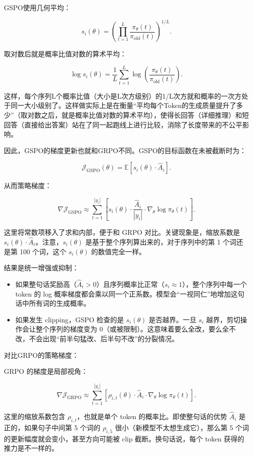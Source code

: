 GSPO使用几何平均：

\[
s_i(\theta)
=
\left(
\prod_{t=1}^{L}
\frac{\pi_\theta(t)}
{\pi_{\mathrm{old}}(t)}
\right)^{1/L}.
\]

取对数后就是概率比值对数的算术平均：

\[
\log s_i(\theta)
=
\frac{1}{L}
\sum_{t=1}^{L}
\log\left(
\frac{\pi_\theta(t)}
{\pi_{\mathrm{old}}(t)}
\right).
\]

这样，每个序列L个概率比值（大小是L次方级别）的1/L次方就和概率的一次方处于同一大小级别了。这样做实际上是在衡量``平均每个Token的生成质量提升了多少''（取对数之后，就是概率比值对数的算术平均），使得长回答（详细推理）和短回答（直接给出答案）站在了同一起跑线上进行比较，消除了长度带来的不公平影响。

因此，GSPO的梯度更新也就和GRPO不同。GSPO的目标函数在未被截断时为：

\[
\mathcal{J}_{\mathrm{GSPO}}(\theta)
=
\mathbb{E}
\left[
s_i(\theta)\cdot \hat{A}_i
\right].
\]

从而策略梯度：

\[
\nabla \mathcal{J}_{\mathrm{GSPO}}
\approx
\sum_{t=1}^{|y_i|}
\left[
s_i(\theta)
\cdot
\frac{\hat{A}_i}{|y_i|}
\cdot
\nabla_\theta \log \pi_\theta(t)
\right].
\]

这里将常数项移入了求和内部，便于和 GRPO 对比。关键现象是，缩放系数是 \(s_i(\theta)\cdot \hat{A}_i\)。注意，\(s_i(\theta)\) 是基于整个序列算出来的，对于序列中的第 1 个词还是第 100 个词，这个 \(s_i(\theta)\) 的数值完全一样。

结果是统一增强或抑制：

\begin{itemize}
\tightlist
\item
  如果整句话奖励高（\(\hat{A}_i>0\)）且序列概率比正常（\(s_i\approx 1\)），整个序列中每一个 token 的 log 概率梯度都会乘以同一个正系数。模型会``一视同仁''地增加这句话中所有词的生成概率。
\item
  如果发生 clipping，GSPO 检查的是 \(s_i(\theta)\) 是否越界。一旦 \(s_i\) 越界，剪切操作会让整个序列的梯度变为 0（或被限制）。这意味着要么全改，要么全不改，不会出现``前半句猛改、后半句不改''的分裂情况。
\end{itemize}

对比GRPO的策略梯度：

GRPO 的梯度是局部视角：

\[
\nabla \mathcal{J}_{\mathrm{GRPO}}
\approx
\sum_{t=1}^{|y_i|}
\left[
\rho_{i,t}(\theta)
\cdot
\hat{A}_i
\cdot
\nabla_\theta \log \pi_\theta(t)
\right].
\]

这里的缩放系数包含 \(\rho_{i,t}\)，也就是单个 token 的概率比。即使整句话的优势 \(\hat{A}_i\) 是正的，如果句子中间第 5 个词的 \(\rho_{i,5}\) 很小（新模型不太想生成它），那么第 5 个词的更新幅度就会变小，甚至方向可能被 clip 截断。换句话说，每个 token 获得的推力是不一样的。

